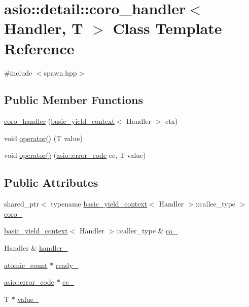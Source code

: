 \hypertarget{classasio_1_1detail_1_1coro__handler}{}\section{asio\+:\+:detail\+:\+:coro\+\_\+handler$<$ Handler, T $>$ Class Template Reference}
\label{classasio_1_1detail_1_1coro__handler}


{\ttfamily \#include $<$spawn.\+hpp$>$}

\subsection*{Public Member Functions}
\begin{DoxyCompactItemize}
\item 
\hyperlink{classasio_1_1detail_1_1coro__handler_abe7945533555f86332e7195cf0c43e60}{coro\+\_\+handler} (\hyperlink{classasio_1_1basic__yield__context}{basic\+\_\+yield\+\_\+context}$<$ Handler $>$ ctx)
\item 
void \hyperlink{classasio_1_1detail_1_1coro__handler_aa7d47bf83d2111577e276be31f9e911a}{operator()} (T value)
\item 
void \hyperlink{classasio_1_1detail_1_1coro__handler_af966e89157a9be84c8825029a2672a95}{operator()} (\hyperlink{classasio_1_1error__code}{asio\+::error\+\_\+code} ec, T value)
\end{DoxyCompactItemize}
\subsection*{Public Attributes}
\begin{DoxyCompactItemize}
\item 
shared\+\_\+ptr$<$ typename \hyperlink{classasio_1_1basic__yield__context}{basic\+\_\+yield\+\_\+context}$<$ Handler $>$\+::callee\+\_\+type $>$ \hyperlink{classasio_1_1detail_1_1coro__handler_ade2c5b3ffa7a8133cf377722ae9927ba}{coro\+\_\+}
\item 
\hyperlink{classasio_1_1basic__yield__context}{basic\+\_\+yield\+\_\+context}$<$ Handler $>$\+::caller\+\_\+type \& \hyperlink{classasio_1_1detail_1_1coro__handler_a5f0b1e6395c255b96ca25c35a4b9aaf8}{ca\+\_\+}
\item 
Handler \& \hyperlink{classasio_1_1detail_1_1coro__handler_a093789199f45e6730fff1953320988d6}{handler\+\_\+}
\item 
\hyperlink{namespaceasio_1_1detail_a75f94bf579dec2f59a0c4af6c4c3606e}{atomic\+\_\+count} $\ast$ \hyperlink{classasio_1_1detail_1_1coro__handler_af0de99911da9c638f145fd4cda8056a5}{ready\+\_\+}
\item 
\hyperlink{classasio_1_1error__code}{asio\+::error\+\_\+code} $\ast$ \hyperlink{classasio_1_1detail_1_1coro__handler_a3ccc5748759a0aab189fbb1c7b9ef54c}{ec\+\_\+}
\item 
T $\ast$ \hyperlink{classasio_1_1detail_1_1coro__handler_adec5b58707ea63ea81b7bbd808826cad}{value\+\_\+}
\end{DoxyCompactItemize}


